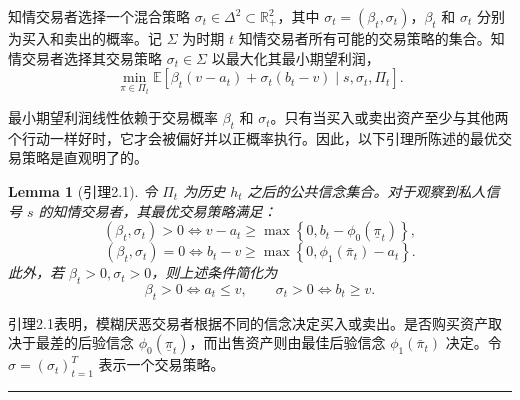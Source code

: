 \documentclass[12pt,a4paper]{article}
\newenvironment{translation}{%
  \par\vspace{2pt}\noindent%
  \color{transblue}%
  \ignorespaces
}{%
  \par\vspace{4pt}\hrule\vspace{6pt}%
}
\newtheorem{lemma}[theorem]{Lemma}
\begin{document}
\begin{translation}
知情交易者选择一个混合策略 $\sigma_t \in \Delta^2 \subset \mathbb{R}_+^2$，其中 $\sigma_t = (\beta_t, \sigma_t)$，$\beta_t$ 和 $\sigma_t$ 分别为买入和卖出的概率。记 $\Sigma$ 为时期 $t$ 知情交易者所有可能的交易策略的集合。知情交易者选择其交易策略 $\sigma_t \in \Sigma$ 以最大化其最小期望利润，
\[
\min_{\pi \in \Pi_t} \mathbb{E}[\beta_t(v - a_t) + \sigma_t(b_t - v) \mid s, \sigma_t, \Pi_t]. \tag{2.4}
\]

最小期望利润线性依赖于交易概率 $\beta_t$ 和 $\sigma_t$。只有当买入或卖出资产至少与其他两个行动一样好时，它才会被偏好并以正概率执行。因此，以下引理所陈述的最优交易策略是直观明了的。

\begin{lemma}[引理2.1]
令 $\Pi_t$ 为历史 $h_t$ 之后的公共信念集合。对于观察到私人信号 $s$ 的知情交易者，其最优交易策略满足：
\[
(\beta_t, \sigma_t) > 0 \iff v - a_t \geq \max\left\{0, b_t - \phi_0(\underline{\pi}_t)\right\},
\]
\[
(\beta_t, \sigma_t) = 0 \iff b_t - v \geq \max\left\{0, \phi_1(\bar{\pi}_t) - a_t\right\}.
\]
此外，若 $\beta_t > 0, \sigma_t > 0$，则上述条件简化为
\[
\beta_t > 0 \iff a_t \leq v, \qquad \sigma_t > 0 \iff b_t \geq v.
\]
\end{lemma}

引理2.1表明，模糊厌恶交易者根据不同的信念决定买入或卖出。是否购买资产取决于最差的后验信念 $\phi_0(\underline{\pi}_t)$，而出售资产则由最佳后验信念 $\phi_1(\bar{\pi}_t)$ 决定。令 $\sigma = (\sigma_t)_{t=1}^{T}$ 表示一个交易策略。
\end{translation}
\end{document}
